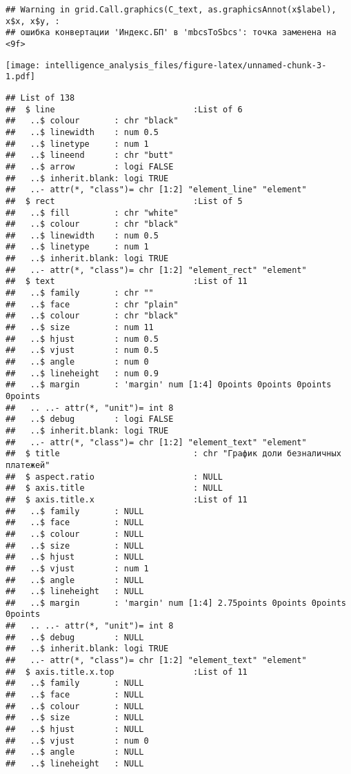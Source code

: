 \documentclass[
]{article}
\begin{document}
\begin{verbatim}
## Warning in grid.Call.graphics(C_text, as.graphicsAnnot(x$label), x$x, x$y, :
## ошибка конвертации 'Индекс.БП' в 'mbcsToSbcs': точка заменена на <9f>
\end{verbatim}

\texttt{[image: intelligence\_analysis\_files/figure-latex/unnamed-chunk-3-1.pdf]}

\begin{verbatim}
## List of 138
##  $ line                            :List of 6
##   ..$ colour       : chr "black"
##   ..$ linewidth    : num 0.5
##   ..$ linetype     : num 1
##   ..$ lineend      : chr "butt"
##   ..$ arrow        : logi FALSE
##   ..$ inherit.blank: logi TRUE
##   ..- attr(*, "class")= chr [1:2] "element_line" "element"
##  $ rect                            :List of 5
##   ..$ fill         : chr "white"
##   ..$ colour       : chr "black"
##   ..$ linewidth    : num 0.5
##   ..$ linetype     : num 1
##   ..$ inherit.blank: logi TRUE
##   ..- attr(*, "class")= chr [1:2] "element_rect" "element"
##  $ text                            :List of 11
##   ..$ family       : chr ""
##   ..$ face         : chr "plain"
##   ..$ colour       : chr "black"
##   ..$ size         : num 11
##   ..$ hjust        : num 0.5
##   ..$ vjust        : num 0.5
##   ..$ angle        : num 0
##   ..$ lineheight   : num 0.9
##   ..$ margin       : 'margin' num [1:4] 0points 0points 0points 0points
##   .. ..- attr(*, "unit")= int 8
##   ..$ debug        : logi FALSE
##   ..$ inherit.blank: logi TRUE
##   ..- attr(*, "class")= chr [1:2] "element_text" "element"
##  $ title                           : chr "График доли безналичных платежей"
##  $ aspect.ratio                    : NULL
##  $ axis.title                      : NULL
##  $ axis.title.x                    :List of 11
##   ..$ family       : NULL
##   ..$ face         : NULL
##   ..$ colour       : NULL
##   ..$ size         : NULL
##   ..$ hjust        : NULL
##   ..$ vjust        : num 1
##   ..$ angle        : NULL
##   ..$ lineheight   : NULL
##   ..$ margin       : 'margin' num [1:4] 2.75points 0points 0points 0points
##   .. ..- attr(*, "unit")= int 8
##   ..$ debug        : NULL
##   ..$ inherit.blank: logi TRUE
##   ..- attr(*, "class")= chr [1:2] "element_text" "element"
##  $ axis.title.x.top                :List of 11
##   ..$ family       : NULL
##   ..$ face         : NULL
##   ..$ colour       : NULL
##   ..$ size         : NULL
##   ..$ hjust        : NULL
##   ..$ vjust        : num 0
##   ..$ angle        : NULL
##   ..$ lineheight   : NULL

\end{verbatim}
\end{document}
